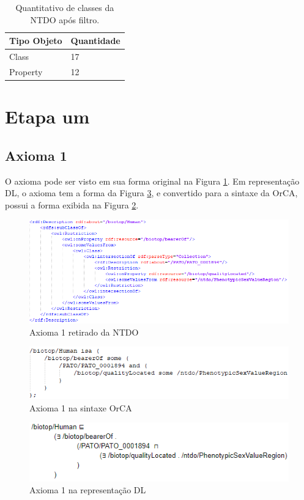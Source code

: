 \documentclass{bcc}
\begin{document}
\begin{table}[H]
\centering
\begin{tabular}{|l|l|}
\hline
Tipo Objeto   & Quantidade \\ \hline
Class         & 17         \\ \hline
Property      & 12         \\ \hline
\end{tabular}
\caption{Quantitativo de classes da NTDO após filtro.}
\label{tab:QtdObjsNTDO_filtro}
\end{table}

\section{Etapa um}
\subsection{Axioma 1}
O axioma pode ser visto em sua forma original na Figura \ref{fig:axioma1_o}. Em representação DL, o axioma tem a forma da Figura \ref{fig:axioma1_dl}, e convertido para a sintaxe da OrCA, possui a forma exibida na Figura \ref{fig:axioma1_orca}. 

\begin{figure}[H]
\centering
\includegraphics[width=.8\textwidth]{Figuras/axioma1_o.png}
\caption{Axioma 1 retirado da NTDO} 
\label{fig:axioma1_o}
\end{figure}

\begin{figure}[H]
\centering
\includegraphics[width=.7\textwidth]{Figuras/axioma1_orca.png}
\caption{Axioma 1 na sintaxe OrCA} 
\label{fig:axioma1_orca}
\end{figure}

\begin{figure}[H]
\centering
\includegraphics[width=.7\textwidth]{Figuras/axioma1_dl.png}
\caption{Axioma 1 na representação DL} 
\label{fig:axioma1_dl}
\end{figure}
\end{document}
